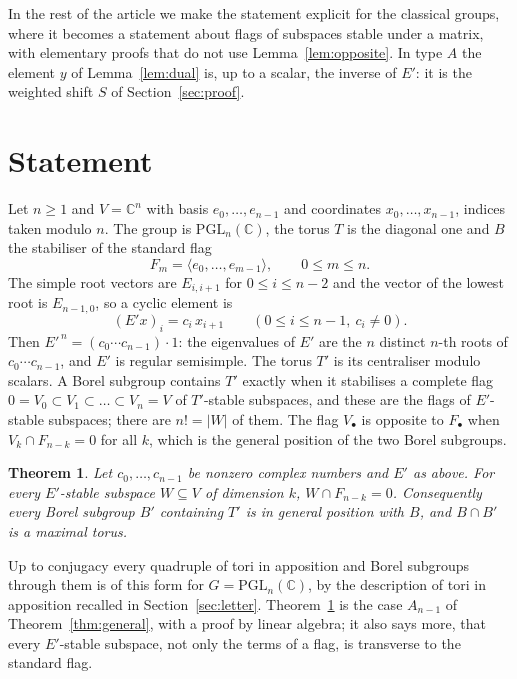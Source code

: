 \documentclass[11pt,a4paper]{amsart}
\newtheorem{theorem}{Theorem}[section]
\theoremstyle{definition}
\theoremstyle{remark}
\newcommand{\PGL}{\mathrm{PGL}}
\newcommand{\C}{\mathbb C}
\begin{document}
In the rest of the article we make the statement explicit for the classical groups, where it becomes a statement about flags of subspaces stable under a matrix, with elementary proofs that do not use Lemma~\ref{lem:opposite}. In type $A$ the element $y$ of Lemma~\ref{lem:dual} is, up to a scalar, the inverse of $E'$: it is the weighted shift $S$ of Section~\ref{sec:proof}.

\section{Statement}\label{sec:statement}

Let $n \geq 1$ and $V = \C^n$ with basis $e_0,\dots,e_{n-1}$ and coordinates $x_0,\dots,x_{n-1}$, indices taken modulo $n$. The group is $\PGL_n(\C)$, the torus $T$ is the diagonal one and $B$ the stabiliser of the standard flag
\[
F_m = \langle e_0,\dots,e_{m-1}\rangle, \qquad 0 \leq m \leq n.
\]
The simple root vectors are $E_{i,i+1}$ for $0 \leq i \leq n-2$ and the vector of the lowest root is $E_{n-1,0}$, so a cyclic element is
\[
(E'x)_i = c_i\, x_{i+1} \qquad (0 \leq i \leq n-1,\ c_i \neq 0).
\]
Then $E'^{\,n} = (c_0\cdots c_{n-1})\cdot 1$: the eigenvalues of $E'$ are the $n$ distinct $n$-th roots of $c_0\cdots c_{n-1}$, and $E'$ is regular semisimple. The torus $T'$ is its centraliser modulo scalars. A Borel subgroup contains $T'$ exactly when it stabilises a complete flag $0 = V_0 \subset V_1 \subset \dots \subset V_n = V$ of $T'$-stable subspaces, and these are the flags of $E'$-stable subspaces; there are $n! = |W|$ of them. The flag $V_\bullet$ is opposite to $F_\bullet$ when $V_k \cap F_{n-k} = 0$ for all $k$, which is the general position of the two Borel subgroups.

\begin{theorem}\label{thm:main}
Let $c_0,\dots,c_{n-1}$ be nonzero complex numbers and $E'$ as above. For every $E'$-stable subspace $W \subseteq V$ of dimension $k$, $W \cap F_{n-k} = 0$. Consequently every Borel subgroup $B'$ containing $T'$ is in general position with $B$, and $B\cap B'$ is a maximal torus.
\end{theorem}

Up to conjugacy every quadruple of tori in apposition and Borel subgroups through them is of this form for $G=\PGL_n(\C)$, by the description of tori in apposition recalled in Section~\ref{sec:letter}. Theorem~\ref{thm:main} is the case $A_{n-1}$ of Theorem~\ref{thm:general}, with a proof by linear algebra; it also says more, that every $E'$-stable subspace, not only the terms of a flag, is transverse to the standard flag.
\end{document}
